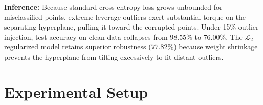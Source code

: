 \documentclass[12pt,a4paper]{article}
\begin{document}
\textbf{Inference:}
Because standard cross-entropy loss grows unbounded for misclassified points, extreme leverage outliers exert substantial torque on the separating hyperplane, pulling it toward the corrupted points. Under 15\% outlier injection, test accuracy on clean data collapses from $98.55\%$ to $76.00\%$. The $\mathcal{L}_2$ regularized model retains superior robustness ($77.82\%$) because weight shrinkage prevents the hyperplane from tilting excessively to fit distant outliers.

\section{Experimental Setup}

\begin{table}[H]
\centering
\caption{Experimental Hardware, Environment, and Tooling}
\label{tab:setup_table}
\end{table}
\end{document}
